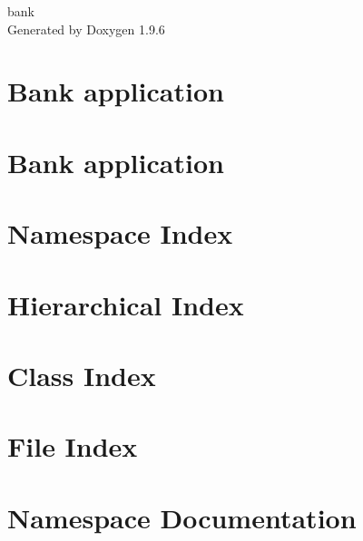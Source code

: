 \documentclass[twoside]{book}
\newcommand{\+}{\discretionary{\mbox{\scriptsize$\hookleftarrow$}}{}{}}
\newcommand{\clearemptydoublepage}{%
    \newpage{\pagestyle{empty}\cleardoublepage}%
  }
\begin{document}
  \raggedbottom
    \hypersetup{pageanchor=false,
                bookmarksnumbered=true,
                pdfencoding=unicode
               }
  \begin{titlepage}
  \vspace*{7cm}
  \begin{center}%
  {\Large bank}\\
  \vspace*{1cm}
  {\large Generated by Doxygen 1.9.6}\\
  \end{center}
  \end{titlepage}
  \clearemptydoublepage
  \tableofcontents
  \clearemptydoublepage
  \hypersetup{pageanchor=true}
\chapter{Bank application}
\label{md_src_main_resources__project_description}

\chapter{Bank application}
\label{md_target_classes__project_description}

\chapter{Namespace Index}

\chapter{Hierarchical Index}

\chapter{Class Index}

\chapter{File Index}

\chapter{Namespace Documentation}







\end{document}
